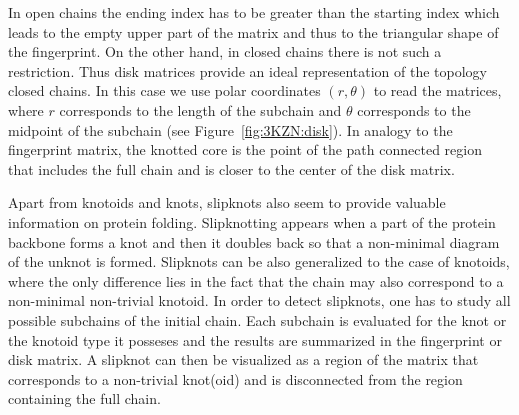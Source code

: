 In open chains the ending index has to be greater than the starting index which leads to the empty upper part of the matrix and thus to the triangular shape of the fingerprint. On the other hand, in closed chains there is not such a restriction\cite{rawdon,rawdon2}. Thus disk matrices provide an ideal representation of the topology closed chains. In this case we use polar coordinates $(r, \theta)$ to read the matrices, where $r$ corresponds to the length of the subchain and $\theta$ corresponds to the midpoint of the subchain (see Figure~\ref{fig:3KZN:disk}). In analogy to the fingerprint matrix, the knotted core is the  point of the path connected region that includes  the full chain and is closer to the center of the disk matrix.

Apart from knotoids and knots, slipknots also seem to provide valuable information on protein folding\cite{yeates}. Slipknotting appears when a part of the protein backbone forms a knot and then it doubles back so that a non-minimal diagram of the unknot is formed\cite{yeates}. Slipknots can be also generalized to the case of knotoids, where the only difference lies in the fact that the chain may also correspond to a non-minimal non-trivial knotoid. In order to detect slipknots, one has to study all possible subchains of the initial chain. Each subchain is evaluated for the knot or the knotoid type it posseses and the results are summarized in the fingerprint\cite{yeates, sulkowska2012,gound} or disk matrix\cite{rawdon}.
A slipknot can then be visualized as a  region of the matrix that corresponds to a non-trivial knot(oid) and  is disconnected from the region containing the full chain.



\clearpage
